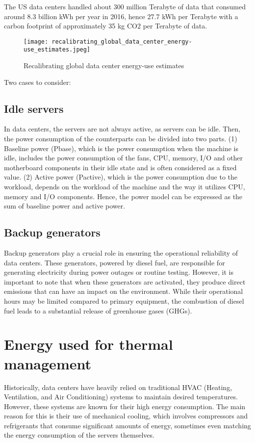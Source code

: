 \documentclass[
  a4paper,  %
  twoside,  %
  bibliography=totoc,
  headsepline,
  cleardoublepage=empty,
  parskip=half,
  draft=false
]{scrbook}
\begin{document}
The US data centers handled about 300 million Terabyte of data that consumed around 8.3 billion kWh per year in 2016, hence 27.7 kWh per Terabyte with a carbon footprint of approximately 35 kg CO2 per Terabyte
of data\cite{corbett2018sustainable}.

\begin{figure}
	\centering
	\texttt{[image: recalibrating\_global\_data\_center\_energy-use\_estimates.jpeg]}
	\caption{Recalibrating global data center energy-use estimates\cite{doi:10.1126/science.aba3758}}
\end{figure}


Two cases to consider:
\subsection{Idle servers}
In data centers, the servers are not always active, as servers can be idle. Then, the power consumption of the counterparts can be divided into two parts. (1) Baseline power (Pbase), which is the power consumption when the machine is idle, includes the power consumption of the fans, CPU, memory, I/O and other motherboard components in their idle state and is often considered as a fixed value. (2) Active power (Pactive), which is the power consumption due to the workload, depends on the workload of the machine and the way it utilizes CPU, memory and I/O components. Hence, the power model can be expressed as the sum of baseline power and active power. 

\subsection{Backup generators}
Backup generators play a crucial role in ensuring the operational reliability of data centers. These generators, powered by diesel fuel, are responsible for generating electricity during power outages or routine testing. However, it is important to note that when these generators are activated, they produce direct emissions that can have an impact on the environment. While their operational hours may be limited compared to primary equipment, the combustion of diesel fuel leads to a substantial release of greenhouse gases (GHGs).

\section{Energy used for thermal management}

Historically, data centers have heavily relied on traditional HVAC (Heating, Ventilation, and Air Conditioning) systems to maintain desired temperatures. However, these systems are known for their high energy consumption. The main reason for this is their use of mechanical cooling, which involves compressors and refrigerants that consume significant amounts of energy, sometimes even matching the energy consumption of the servers themselves.
\end{document}
